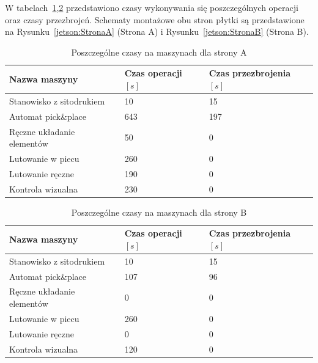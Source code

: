 \breakparagraph{}
W tabelach~\ref{jetson:A},\ref{jetson:B} przedstawiono czasy wykonywania się poszczególnych operacji oraz czasy przezbrojeń. Schematy montażowe obu stron płytki są przedstawione na Rysunku~\ref{jetson:StronaA} (Strona A) i Rysunku~\ref{jetson:StronaB} (Strona B).

\begin{table}[H]
	\centering
	\caption{Poszczególne czasy na maszynach dla strony A}
	\begin{tabular}{lll}
		\toprule
		Nazwa maszyny                 & Czas operacji $[s]$ & Czas przezbrojenia $[s]$ \\
		\midrule
		Stanowisko z sitodrukiem      & 10                  & 15                       \\
		Automat pick\&place           & 643                 & 197                      \\
		Ręczne układanie elementów & 50                  & 0                        \\
		Lutowanie w piecu             & 260                 & 0                        \\
		Lutowanie ręczne             & 190                 & 0                        \\
		Kontrola wizualna             & 230                 & 0                        \\
		\bottomrule
	\end{tabular}
	\label{jetson:A}
\end{table}

\begin{table}[H]
	\centering
	\caption{Poszczególne czasy na maszynach dla strony B}
	\begin{tabular}{lll}
		\toprule
		Nazwa maszyny                 & Czas operacji $[s]$ & Czas przezbrojenia $[s]$ \\
		\midrule
		Stanowisko z sitodrukiem      & 10                  & 15                       \\
		Automat pick\&place           & 107                 & 96                       \\
		Ręczne układanie elementów & 0                   & 0                        \\
		Lutowanie w piecu             & 260                 & 0                        \\
		Lutowanie ręczne             & 0                   & 0                        \\
		Kontrola wizualna             & 120                 & 0                        \\
		\bottomrule
	\end{tabular}
	\label{jetson:B}
\end{table}

